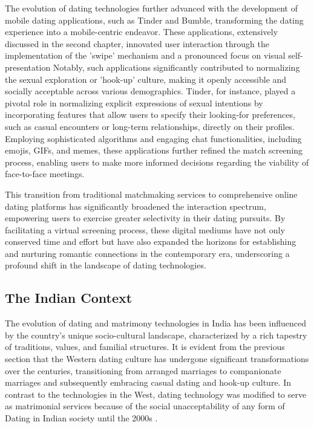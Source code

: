 The evolution of dating technologies further advanced with the development of mobile dating applications, such as Tinder and Bumble, transforming the dating experience into a mobile-centric endeavor. These applications, extensively discussed in the second chapter, innovated user interaction through the implementation of the 'swipe' mechanism and a pronounced focus on visual self-presentation\cite{noauthor_dating_nodate, marcus2016swipe} Notably, such applications significantly contributed to normalizing the sexual exploration or 'hook-up' culture, making it openly accessible and socially acceptable across various demographics\cite{noauthor_dating_nodate, marcus2016swipe}. Tinder, for instance, played a pivotal role in normalizing explicit expressions of sexual intentions by incorporating features that allow users to specify their looking-for preferences, such as casual encounters or long-term relationships, directly on their profiles. Employing sophisticated algorithms and engaging chat functionalities, including emojis, GIFs, and memes, these applications further refined the match screening process, enabling users to make more informed decisions regarding the viability of face-to-face meetings.

This transition from traditional matchmaking services to comprehensive online dating platforms has significantly broadened the interaction spectrum, empowering users to exercise greater selectivity in their dating pursuits. By facilitating a virtual screening process, these digital mediums have not only conserved time and effort but have also expanded the horizons for establishing and nurturing romantic connections in the contemporary era, underscoring a profound shift in the landscape of dating technologies.


\subsection{The Indian Context}
The evolution of dating and matrimony technologies in India has been influenced by the country's unique socio-cultural landscape, characterized by a rich tapestry of traditions, values, and familial structures. It is evident from the previous section that the Western dating culture has undergone significant transformations over the centuries, transitioning from arranged marriages to companionate marriages and subsequently embracing casual dating and hook-up culture. In contrast to the technologies in the West, dating technology was modified to serve as matrimonial services because of the social unacceptability of any form of Dating in Indian society until the 2000s \cite{doshi_date_2016, noauthor_modern_2017, sharma_towards_2019}. 

